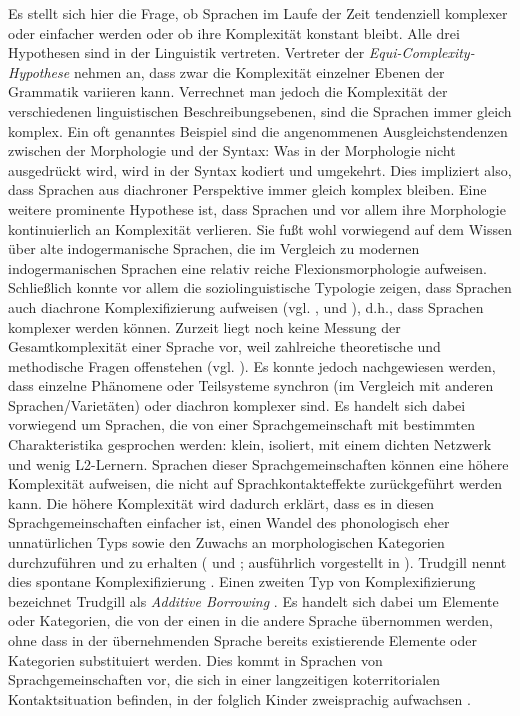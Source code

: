 Es stellt sich hier die Frage, ob Sprachen im Laufe der Zeit tendenziell komplexer oder einfacher werden oder ob ihre Komplexität konstant bleibt. Alle drei Hypothesen sind in der Linguistik vertreten. Vertreter der \textit{Equi-Com\-ple\-xi\-ty-Hy\-po\-the\-se} nehmen an, dass zwar die Komplexität einzelner Ebenen der Grammatik variieren kann. Verrechnet man jedoch die Komplexität der verschiedenen linguistischen Beschreibungsebenen, sind die Sprachen immer gleich komplex. Ein oft genanntes Beispiel sind die angenommenen Ausgleichstendenzen zwischen der Morphologie und der Syntax: Was in der Morphologie nicht ausgedrückt wird, wird in der Syntax kodiert und umgekehrt. Dies impliziert also, dass Sprachen aus diachroner Perspektive immer gleich komplex bleiben. Eine weitere prominente Hypothese ist, dass Sprachen und vor allem ihre Morphologie kontinuierlich an Komplexität verlieren. Sie fußt wohl vorwiegend auf dem Wissen über alte indogermanische Sprachen, die im Vergleich zu modernen indogermanischen Sprachen eine relativ reiche Flexionsmorphologie aufweisen. Schließlich konnte vor allem die soziolinguistische Typologie zeigen, dass Sprachen auch diachrone Komplexifizierung aufweisen (vgl. ,  und ), d.h., dass Sprachen komplexer werden können. Zurzeit liegt noch keine Messung der Gesamtkomplexität einer Sprache vor, weil zahlreiche theoretische und methodische Fragen offenstehen (vgl. ). Es konnte jedoch nachgewiesen werden, dass einzelne Phänomene oder Teilsysteme synchron (im Vergleich mit anderen Sprachen/Varietäten) oder diachron komplexer sind. Es handelt sich dabei vorwiegend um Sprachen, die von einer Sprachgemeinschaft mit bestimmten Charakteristika gesprochen werden: klein, isoliert, mit einem dichten Netzwerk und wenig L2-Ler\-nern. Sprachen dieser Sprachgemeinschaften können eine höhere Komplexität aufweisen, die nicht auf Sprachkontakteffekte zurückgeführt werden kann. Die höhere Komplexität wird dadurch erklärt, dass es in diesen Sprachgemeinschaften einfacher ist, einen Wandel des phonologisch eher unnatürlichen Typs sowie den Zuwachs an morphologischen Kategorien durchzuführen und zu erhalten (\citealt[11]{Trudgill1996} und \citealt[109]{Trudgill2009}; ausführlich vorgestellt in ). Trudgill nennt dies spontane Komplexifizierung \citep[71]{Trudgill2011}. Einen zweiten Typ von Komplexifizierung bezeichnet Trudgill als \textit{Additive Borrowing} \citep[27]{Trudgill2011}. Es handelt sich dabei um Elemente oder Kategorien, die von der einen in die andere Sprache übernommen werden, ohne dass in der übernehmenden Sprache bereits existierende Elemente oder Kategorien substituiert werden. Dies kommt in Sprachen von Sprachgemeinschaften vor, die sich in einer langzeitigen koterritorialen Kontaktsituation befinden, in der folglich Kinder zweisprachig aufwachsen \citep[34]{Trudgill2011}.

